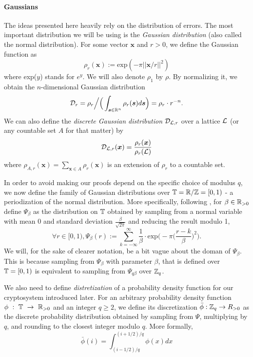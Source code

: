 \paragraph{Gaussians}
The ideas presented here heavily rely on the distribution of errors. The most important distribution we will be using is the \textit{Gaussian distribution} (also called the normal distribution). For some vector $\bm{x}$ and $r>0$, we define the Gaussian function as
\[ \rho_r (\bm{x}) := \text{exp}(- \pi ||\bm{x}/r||^2) \]
where exp($y$) stands for $e^y$. We will also denote $\rho_1$ by $\rho$. By normalizing it, we obtain the $n$-dimensional Gaussian distribution
\[\mathcal{D}_r = \rho_r \Big/ \Big( \int_{\boldsymbol{s} \in \mathbb{R}^n} \rho_r(\boldsymbol{s}) d\boldsymbol{s} \Big) = \rho_r \cdot r^{-n}. \]
We can also define the \textit{discrete Gaussian distribution} $\mathcal{D}_{\mathcal{L}, r}$ over a lattice $\mathcal{L}$ (or any countable set $A$ for that matter) by
\begin{equation} \mathcal{D}_{\mathcal{L}, r}(\boldsymbol{x}) = \frac{\rho_r(\boldsymbol{x})}{\rho_r(\mathcal{L})} \end{equation}
where $\rho_{A, r}(\bm{x}) = \sum_{\bm{x} \in A} \rho_r(\bm{x})$ is an extension of $\rho_r$ to a countable set.

In order to avoid making our proofs depend on the specific choice of modulus $q$, we now define the family of Gaussian distributions over $\mathbb{T} = \mathbb{R}/\mathbb{Z} = [0,1)$ - a periodization of the normal distribution. More specifically, following \cite{regev}, for $\beta \in \mathbb{R}_{> 0}$ define $\Psi_{\beta}$ as the distribution on $\mathbb{T}$ obtained by sampling from a normal variable with mean 0 and standard deviation $\frac{\beta}{\sqrt{2\pi}}$ and reducing the result modulo 1,
\begin{equation} \forall r \in [0,1), \Psi_{\beta}(r) := \sum_{k = -\infty}^{\infty} \frac{1}{\beta} \cdot \text{exp} \bigg(- \pi \Big(\frac{r-k}{\beta}\Big)^2\bigg). \end{equation}
We will, for the sake of clearer notation, be a bit vague about the doman of $\Psi_{\beta}$. This is because sampling from $\Psi_{\beta}$ with parameter $\beta$, that is defined over $\mathbb{T} = [0,1)$ is equivalent to sampling from $\Psi_{q \beta}$ over $\mathbb{Z}_q$. 

We also need to define \textit{distretization} of a probability density function for our cryptosystem introduced later. For an arbitrary probability density function $\phi~:~\mathbb{T}~\to~\mathbb{R}_{>0}$ and an integer $q \geq 2$, we define its discretization $\bar{\phi} : \mathbb{Z}_q \rightarrow R_{>0}$ as the discrete probability distribution obtained by sampling from $\Psi$, multiplying by $q$, and rounding to the closest integer modulo $q$. More formally,
\begin{equation} \bar{\phi}(i) = \int_{(i -1/2)/q}^{(i + 1/2)/q} \phi(x) dx \end{equation}

